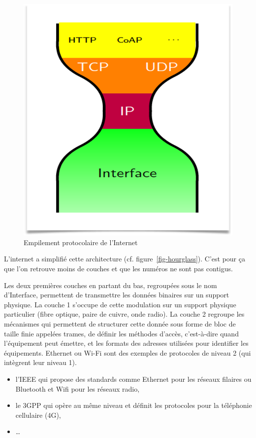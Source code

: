  \begin{figure}[tbp]
\centerline{\includegraphics[width=.5\columnwidth]{Pictures/hourglass.png}}
\caption{Empilement protocolaire de l'Internet}
\label{fig-hourglass}
\end{figure}

  \vspace{1em}

  L'internet a simplifié cette architecture (cf. figure~\vref{fig-hourglass}). C'est pour ça que l'on retrouve moins de couches et que les numéros ne sont pas contigus. 
  
  
    \vspace{1em}

  Les deux premières couches  en partant du bas, regroupées sous le nom d'Interface, permettent de transmettre les données binaires sur un support physique. La couche 1 s’occupe de cette modulation sur un support physique particulier (fibre optique, paire de cuivre, onde radio). La couche 2 regroupe les mécanismes qui permettent de structurer cette donnée sous forme de bloc de taille finie appelées trames, de définir les méthodes d’accès, c’est-à-dire quand l’équipement peut émettre, et les formats des adresses utilisées pour identifier les équipements. Ethernet ou Wi-Fi sont des exemples de protocoles de niveau 2 (qui intègrent leur niveau 1).

\begin{itemize}
\item l’\ac{IEEE} qui propose des standards comme Ethernet pour les réseaux filaires ou Bluetooth et Wifi pour les réseaux radio,
\item le \ac{3GPP}  qui opère au même niveau et définit les protocoles pour la téléphonie cellulaire (4G),
\item \ldots
\end{itemize}


